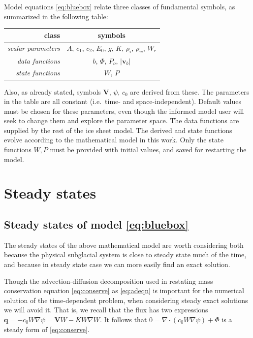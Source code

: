 \documentclass[11pt,final]{amsart}%
\newcommand\bv{\mathbf{v}}
\newcommand\bV{\mathbf{V}}
\newcommand\bq{\mathbf{q}}
\newcommand{\Div}{\nabla\cdot}
\newcommand{\grad}{\nabla}
\begin{document}
Model equations \eqref{eq:bluebox} relate three classes of fundamental symbols, as summarized in the following table:

\begin{table}[h]
\begin{tabular}{r|c}
class & symbols \\ \hline
\emph{scalar parameters} & $A$, $c_1$, $c_2$, $E_0$, $g$, $K$, $\rho_i$, $\rho_w$, $W_r$ \\
\emph{data functions} & $b$, $\Phi$, $P_o$, $|\bv_b|$ \\
\emph{state functions} & $W$, $P$
\end{tabular}
\end{table}

\noindent Also, as already stated, symbols $\bV$, $\psi$, $c_0$ are derived from these.  The parameters in the table are all constant (i.e.~time- and space-independent).  %
Default values must be chosen for these parameters, even though the informed model user will seek to change them and explore the parameter space.  The data functions are supplied by the rest of the ice sheet model.  The derived and state functions evolve according to the mathematical model in this work.  Only the state functions $W,P$ must be provided with initial values, and saved for restarting the model.


\section{Steady states}  \label{sec:steadyverif}

\subsection*{Steady states of model \eqref{eq:bluebox}}  The steady states of the above mathematical model are worth considering both because the physical subglacial system is close to steady state much of the time, and because in steady state case we can more easily find an exact solution.

Though the advection-diffusion decomposition used in restating mass conservation equation \eqref{eq:conserve} as \eqref{eq:adeqn} is important for the numerical solution of the time-dependent problem, when considering steady exact solutions we will avoid it.  That is, we recall that the flux has two expressions $\bq = - c_0 W \grad \psi = \bV W - K W \grad W$.  It follows that $0 = \Div\left(c_0 W \grad \psi\right) + \Phi$ is a steady form of \eqref{eq:conserve}.
\end{document}
